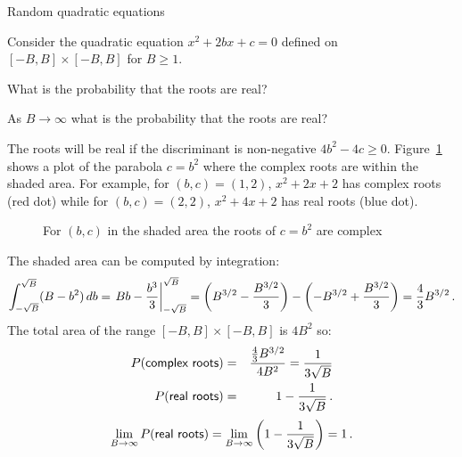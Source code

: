 
\begin{prob}{Random quadratic equations}

Consider the quadratic equation $x^2+2bx+c=0$ defined on $[-B,B]\times[-B,B]$ for $B\geq 1$.

 What is the probability that the roots are real?

 As $B\rightarrow \infty$ what is the probability that the roots are real?
\end{prob}

\solution{}

The roots will be real if the discriminant is non-negative $4b^2-4c\geq 0$. Figure~\ref{f.real-roots} shows a plot of the parabola $c=b^2$ where the complex roots are within the shaded area. For example, for $(b,c)=(1,2)$, $x^2+2x+2$ has complex roots (red dot) while for $(b,c)=(2,2)$, $x^2+4x+2$ has real roots (blue dot).

\begin{figure}[tb]
\begin{center}
\end{center}
\caption{For $(b,c)$ in the shaded area the roots of $c=b^2$ are complex}\label{f.real-roots}
\end{figure}

The shaded area can be computed by integration:
\[
\int_{-\sqrt{B}}^{\sqrt{B}} (B-b^2)\,db=
\left. Bb-\displaystyle\frac{b^3}{3}\right|_{-\sqrt{B}}^{\sqrt{B}}=
\left(B^{3/2}-\frac{B^{3/2}}{3}\right)-
\left(-B^{3/2}+\frac{B^{3/2}}{3}\right)=
\displaystyle\frac{4}{3}B^{3/2}\,.
\]
The total area of the range $[-B,B]\times[-B,B]$ is $4B^2$ so:
\begin{eqnarray*}
P(\textsf{complex roots})&=&\displaystyle\frac{\frac{4}{3}B^{3/2}}{4B^2}=\displaystyle\frac{1}{3\sqrt{B}}\\
P(\textsf{real roots})&=&1-\displaystyle\frac{1}{3\sqrt{B}}\,.
\end{eqnarray*}
\[
\lim_{B\rightarrow\infty}
P(\textsf{real roots})=
\lim_{B\rightarrow\infty} \left(1-\displaystyle\frac{1}{3\sqrt{B}}\right)=
1\,.
\]


